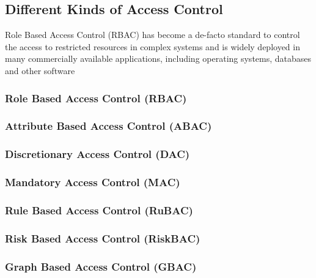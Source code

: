 
\subsection{Different Kinds of Access Control}
Role Based Access Control (RBAC) has become a de-facto standard to control the access to restricted resources in complex systems and is widely deployed in many commercially available applications, including operating systems, databases and other software

\subsubsection{Role Based Access Control (RBAC)}

\subsubsection{Attribute Based Access Control (ABAC)}

\subsubsection{Discretionary Access Control (DAC)}

\subsubsection{Mandatory Access Control (MAC)}

\subsubsection{Rule Based Access Control (RuBAC)}

\subsubsection{Risk Based Access Control (RiskBAC)}

\subsubsection{Graph Based Access Control (GBAC)}

\subsubsection{}

